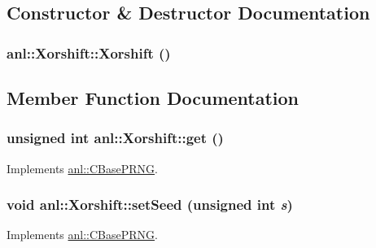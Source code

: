 \subsection{Constructor \& Destructor Documentation}
\hypertarget{classanl_1_1Xorshift_ad975d9a90cfc1c46132dfc4262a148a6}{
\subsubsection[{Xorshift}]{\setlength{\rightskip}{0pt plus 5cm}anl::Xorshift::Xorshift ()}}
\label{classanl_1_1Xorshift_ad975d9a90cfc1c46132dfc4262a148a6}


\subsection{Member Function Documentation}
\hypertarget{classanl_1_1Xorshift_a4077fd48d3a6dd1a57a6aa3089441dd7}{
\subsubsection[{get}]{\setlength{\rightskip}{0pt plus 5cm}unsigned int anl::Xorshift::get ()}}
\label{classanl_1_1Xorshift_a4077fd48d3a6dd1a57a6aa3089441dd7}


Implements \hyperlink{classanl_1_1CBasePRNG_a7a0fcd0d3c4b0f9f160835b4b254a1ed}{anl::CBasePRNG}.\hypertarget{classanl_1_1Xorshift_a0fd07695b4ac9d214db30ce5f896f958}{
\subsubsection[{setSeed}]{\setlength{\rightskip}{0pt plus 5cm}void anl::Xorshift::setSeed (unsigned int {\em s})}}
\label{classanl_1_1Xorshift_a0fd07695b4ac9d214db30ce5f896f958}


Implements \hyperlink{classanl_1_1CBasePRNG_a6e9a81522fe055749739e4d79b5aa27e}{anl::CBasePRNG}.

